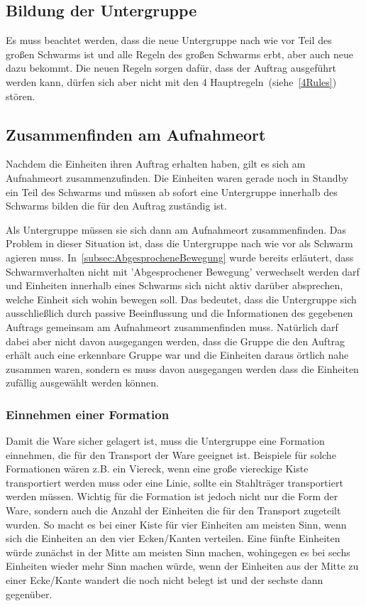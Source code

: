 \subsection*{Bildung der Untergruppe}
Es muss beachtet werden, dass die neue Untergruppe nach wie vor Teil des großen Schwarms ist und alle Regeln des großen Schwarms erbt, aber auch neue dazu bekommt.
Die neuen Regeln sorgen dafür, dass der Auftrag ausgeführt werden kann, dürfen sich aber nicht mit den 4 Hauptregeln~(siehe~\autoref{4Rules}) stören.

\subsection*{Zusammenfinden am Aufnahmeort}
Nachdem die Einheiten ihren Auftrag erhalten haben, gilt es sich am Aufnahmeort zusammenzufinden.
Die Einheiten waren gerade noch in Standby ein Teil des Schwarms und müssen ab sofort eine Untergruppe innerhalb des Schwarms bilden die für den Auftrag zuständig ist.

Als Untergruppe müssen sie sich dann am Aufnahmeort zusammenfinden.
Das Problem in dieser Situation ist, dass die Untergruppe nach wie vor als Schwarm agieren muss.
In~\autoref{subsec:AbgesprocheneBewegung} wurde bereits erläutert, dass Schwarmverhalten nicht mit 'Abgesprochener Bewegung' verwechselt werden darf und Einheiten innerhalb eines Schwarms sich nicht aktiv darüber absprechen, welche Einheit sich wohin bewegen soll.
Das bedeutet, dass die Untergruppe sich ausschließlich durch passive Beeinflussung und die Informationen des gegebenen Auftrags gemeinsam am Aufnahmeort zusammenfinden muss.
Natürlich darf dabei aber nicht davon ausgegangen werden, dass die Gruppe die den Auftrag erhält auch eine erkennbare Gruppe war und die Einheiten daraus örtlich nahe zusammen waren, sondern es muss davon ausgegangen werden dass die Einheiten zufällig ausgewählt werden können.

\subsubsection*{Einnehmen einer Formation}
Damit die Ware sicher gelagert ist, muss die Untergruppe eine Formation einnehmen, die für den Transport der Ware geeignet ist.
Beispiele für solche Formationen wären z.B. ein Viereck, wenn eine große viereckige Kiste transportiert werden muss oder eine Linie, sollte ein Stahlträger transportiert werden müssen.
Wichtig für die Formation ist jedoch nicht nur die Form der Ware, sondern auch die Anzahl der Einheiten die für den Transport zugeteilt wurden.
So macht es bei einer Kiste für vier Einheiten am meisten Sinn, wenn sich die Einheiten an den vier Ecken/Kanten verteilen.
Eine fünfte Einheiten würde zunächst in der Mitte am meisten Sinn machen, wohingegen es bei sechs Einheiten wieder mehr Sinn machen würde, wenn der Einheiten aus der Mitte zu einer Ecke/Kante wandert die noch nicht belegt ist und der sechste dann gegenüber.

